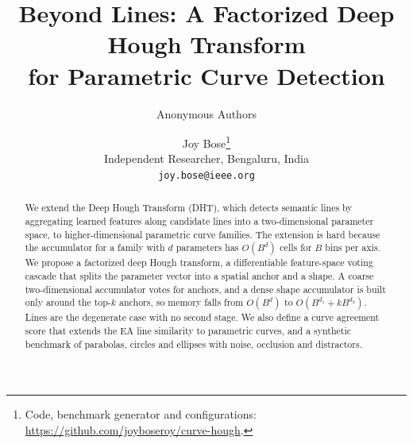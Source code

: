 \documentclass[11pt]{article}
\title{Beyond Lines: A Factorized Deep Hough Transform\\for Parametric Curve Detection}
\author{Anonymous Authors}
\author{Joy Bose\thanks{Code, benchmark generator and configurations: \url{https://github.com/joyboseroy/curve-hough}.}\\Independent Researcher, Bengaluru, India\\\texttt{joy.bose@ieee.org}}
\date{}
\begin{document}
\maketitle

\begin{abstract}
We extend the Deep Hough Transform (DHT), which detects semantic lines by aggregating learned features along candidate lines into a two-dimensional parameter space, to higher-dimensional parametric curve families. The extension is hard because the accumulator for a family with $d$ parameters has $O(B^{d})$ cells for $B$ bins per axis. We propose a factorized deep Hough transform, a differentiable feature-space voting cascade that splits the parameter vector into a spatial anchor and a shape. A coarse two-dimensional accumulator votes for anchors, and a dense shape accumulator is built only around the top-$k$ anchors, so memory falls from $O(B^{d})$ to $O(B^{d_1}+kB^{d_2})$. Lines are the degenerate case with no second stage. We also define a curve agreement score that extends the EA line similarity to parametric curves, and a synthetic benchmark of parabolas, circles and ellipses with noise, occlusion and distractors.


\end{abstract}
\end{document}
